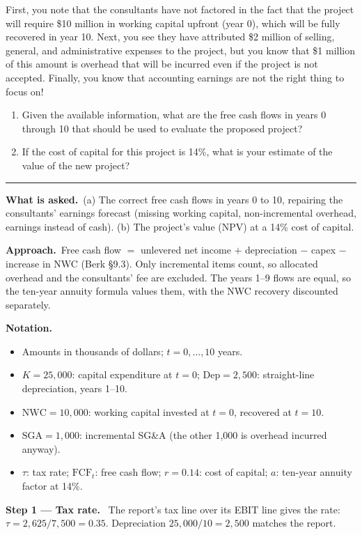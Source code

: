 \documentclass[11pt,a4paper]{article}
\numberwithin{equation}{section}
\newcommand{\step}[2]{\par\medskip\noindent\textbf{Step #1 --- #2.}~}
\newenvironment{notation}{\par\noindent\textbf{Notation.}\begin{itemize}[leftmargin=1.4em]}{\end{itemize}}
\newcommand{\asked}{\par\medskip\noindent\textbf{What is asked.}~}
\newcommand{\approach}{\par\smallskip\noindent\textbf{Approach.}~}
\newcommand{\stmtend}{\par\endgroup\nopagebreak\noindent\rule{\linewidth}{0.4pt}\par\medskip}
\begin{document}
First, you note that the consultants have not factored in the fact that the project will require
\$10 million in working capital upfront (year 0), which will be fully recovered in year 10. Next,
you see they have attributed \$2 million of selling, general, and administrative expenses to the
project, but you know that \$1 million of this amount is overhead that will be incurred even if the
project is not accepted. Finally, you know that accounting earnings are not the right thing to focus
on!

\begin{enumerate}
\def\labelenumi{\alph{enumi}.}
\item
  Given the available information, what are the free cash flows in years 0 through 10 that should be
  used to evaluate the proposed project?
\item
  If the cost of capital for this project is 14\%, what is your estimate of the value of the new
  project?
\end{enumerate}
\stmtend

\asked (a) The correct free cash flows in years 0 to 10, repairing the consultants' earnings
forecast (missing working capital, non-incremental overhead, earnings instead of cash). (b) The
project's value (NPV) at a 14\% cost of capital.

\approach Free cash flow $=$ unlevered net income $+$ depreciation $-$ capex $-$ increase in NWC
(Berk \S9.3). Only incremental items count, so allocated overhead and the consultants' fee are
excluded. The years 1--9 flows are equal, so the ten-year annuity formula values them, with the
NWC recovery discounted separately.

\begin{notation}
  \item Amounts in thousands of dollars; $t=0,\dots,10$ years.
  \item $K=25{,}000$: capital expenditure at $t=0$; $\mathrm{Dep}=2{,}500$: straight-line depreciation, years 1--10.
  \item $\mathrm{NWC}=10{,}000$: working capital invested at $t=0$, recovered at $t=10$.
  \item $\mathrm{SGA}=1{,}000$: incremental SG\&A (the other 1{,}000 is overhead incurred anyway).
  \item $\tau$: tax rate; $\mathrm{FCF}_t$: free cash flow; $r=0.14$: cost of capital; $a$: ten-year annuity factor at 14\%.
\end{notation}

\step{1}{Tax rate} The report's tax line over its EBIT line gives the rate:
$\tau = 2{,}625/7{,}500 = 0.35$. Depreciation $25{,}000/10=2{,}500$ matches the report.
\end{document}
